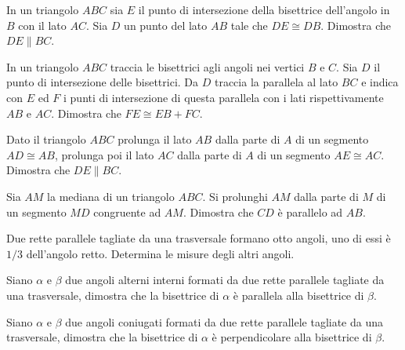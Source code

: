 \begin{multicols}{2}
\begin{esercizio}
\label{ese:3.35}
In un triangolo \(ABC\) sia \(E\) il punto di intersezione della 
bisettrice dell'angolo in \(B\) con il lato \(AC\). Sia \(D\) un punto del 
lato \(AB\) tale che \(DE\cong DB\). Dimostra che \(DE\parallel BC\).
\end{esercizio}

\begin{esercizio}
\label{ese:3.36}
In un triangolo \(ABC\) traccia le bisettrici agli angoli nei vertici 
\(B\) e \(C\). Sia \(D\) il punto di intersezione delle bisettrici. Da \(D\) 
traccia la parallela al lato \(BC\) e indica con \(E\) ed \(F\) i punti di 
intersezione di questa parallela con i lati rispettivamente \(AB\) e 
\(AC\). Dimostra che \(FE\cong EB+FC\).
\end{esercizio}

\begin{esercizio}
\label{ese:3.37}
Dato il triangolo \(ABC\) prolunga il lato \(AB\) dalla parte di \(A\) di 
un segmento \(AD\cong AB\), prolunga poi il lato \(AC\) dalla parte di \(A\) 
di un segmento \(AE\cong AC\). Dimostra che \(DE\parallel BC\).
\end{esercizio}

\begin{esercizio}
\label{ese:3.38}
Sia \(AM\) la mediana di un triangolo \(ABC\). Si prolunghi \(AM\) dalla 
parte di \(M\) di un segmento \(MD\) congruente ad \(AM\). Dimostra che 
\(CD\) è parallelo ad \(AB\).
\end{esercizio}

\begin{esercizio}
\label{ese:3.39}
Due rette parallele tagliate da una trasversale formano otto angoli, 
uno di essi è \(1/3\) dell'angolo retto. Determina le misure degli 
altri angoli.
\end{esercizio}

\begin{esercizio}
\label{ese:3.40}
Siano \(\alpha\) e \(\beta\) due angoli alterni interni formati da due 
rette parallele tagliate da una trasversale, dimostra che la 
bisettrice di \(\alpha\) è parallela alla bisettrice di \(\beta\).
\end{esercizio}

\begin{esercizio}
\label{ese:3.41}
Siano \(\alpha\) e \(\beta\) due angoli coniugati formati da due rette 
parallele tagliate da una trasversale, dimostra che la bisettrice di 
\(\alpha\) è perpendicolare alla bisettrice di \(\beta\).
\end{esercizio}


\end{multicols}
